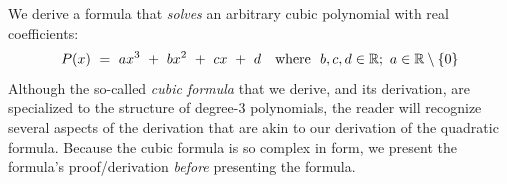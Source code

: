 \bigskip


\noindent
We derive a formula that {\it solves} an arbitrary cubic polynomial
 with real coefficients:
\begin{equation}
\label{eq:generic-cubic-1}
P(x) \ = \  ax^3 \ + \ bx^2 \ + \ cx \ + \ d \ \ \mbox{  where  }
\ b,c, d  \in \mathbb{R};\ a \in \mathbb{R} \setminus \{0\}
\end{equation}
Although the so-called {\em cubic formula} that we derive, and its
derivation, are specialized to the structure of degree-$3$
polynomials, the reader will recognize several aspects of the
derivation that are akin to our derivation of the quadratic formula.
Because the cubic formula is so complex in form, we present the
formula's proof/derivation {\em before} presenting the formula.

